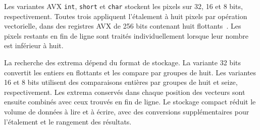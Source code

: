 Les variantes AVX \texttt{int}, \texttt{short} et \texttt{char} stockent les pixels sur 32, 16 et 8 bits, respectivement. Toutes trois appliquent l'étalement à huit pixels par opération vectorielle, dans des registres AVX de 256 bits contenant huit flottants~\cite{intel-intrinsics}. Les pixels restants en fin de ligne sont traités individuellement lorsque leur nombre est inférieur à huit.

La recherche des extrema dépend du format de stockage. La variante 32 bits convertit les entiers en flottants et les compare par groupes de huit. Les variantes 16 et 8 bits utilisent des comparaisons entières par groupes de huit et seize, respectivement. Les extrema conservés dans chaque position des vecteurs sont ensuite combinés avec ceux trouvés en fin de ligne. Le stockage compact réduit le volume de données à lire et à écrire, avec des conversions supplémentaires pour l'étalement et le rangement des résultats.
